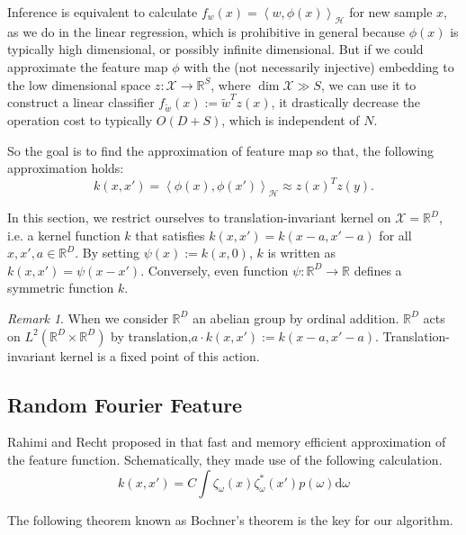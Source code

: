 \documentclass{amsart}
\theoremstyle{definition}
\theoremstyle{remark}
\newtheorem{remark}[theorem]{Remark}
\numberwithin{equation}{section}
\begin{document}
Inference is equivalent to calculate $f_w(x) = \left< w, \phi(x)\right>_\mathcal{H}$ for new sample $x$, as we do in the linear regression, which is prohibitive in general because $\phi(x)$ is typically high dimensional, or possibly
infinite dimensional.
But if we could approximate the feature map $\phi$ with the (not necessarily injective) embedding to the low dimensional space $z: \mathcal{X}\to \mathbb{R}^S$, where $\dim\mathcal{X} \gg S$,
we can use it to construct a linear classifier $f_{\tilde{w}}(x) := \tilde{w}^Tz(x)$, it drastically decrease the operation cost to typically $O(D+S)$, which is independent of $N$.

So the goal is to find the approximation of feature map so that, the following approximation holds:
\begin{equation}
k(x, x') = \left<\phi(x), \phi(x') \right>_\mathcal{H} \approx z(x)^Tz(y).
\end{equation}

In this section, we restrict ourselves to translation-invariant kernel on $\mathcal{X} = \mathbb{R}^D$,
i.e. a kernel function $k$ that satisfies $k(x, x') = k(x-a, x'-a)$ for all $x, x', a \in \mathbb{R}^D$.
By setting $\psi(x):= k(x, 0)$, $k$ is written as $k(x, x')=\psi(x-x')$.
Conversely, even function $\psi: \mathbb{R}^D\to \mathbb{R}$ defines a symmetric function $k$.

\begin{remark}
When we consider $\mathbb{R}^D$ an abelian group by ordinal addition.
$\mathbb{R}^D$ acts on $L^2(\mathbb{R}^D\times \mathbb{R}^D)$ by translation,$a\cdot k(x, x'):= k(x-a, x'-a)$.
Translation-invariant kernel is a fixed point of this action.
\end{remark}

\subsection{Random Fourier Feature}

Rahimi and Recht proposed in \cite{rahimi2007random} that fast and memory efficient
approximation of the feature function. Schematically, they made use of the following calculation.
\begin{equation}
k(x, x') = C \int \zeta_\omega(x) \zeta_\omega^{\ast}(x') p(\omega) \mathrm{d}\omega 
\end{equation}


The following theorem known as Bochner's theorem is the key for our algorithm.
\end{document}
